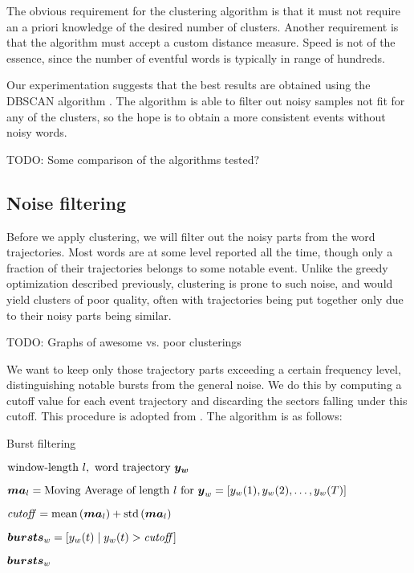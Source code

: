 The obvious requirement for the clustering algorithm is that it must not require an a priori knowledge of the desired number of clusters. Another requirement is that the algorithm must accept a custom distance measure. Speed is not of the essence, since the number of eventful words is typically in range of hundreds.

Our experimentation suggests that the best results are obtained using the DBSCAN algorithm \cite{dbscan}. The algorithm is able to filter out noisy samples not fit for any of the clusters, so the hope is to obtain a more consistent events without noisy words.

{\color{blue} TODO: Some comparison of the algorithms tested?}


\subsection{Noise filtering}
Before we apply clustering, we will filter out the noisy parts from the word trajectories. Most words are at some level reported all the time, though only a fraction of their trajectories belongs to some notable event. Unlike the greedy optimization described previously, clustering is prone to such noise, and would yield clusters of poor quality, often with trajectories being put together only due to their noisy parts being similar.

{\color{red} TODO: Graphs of awesome vs. poor clusterings}

We want to keep only those trajectory parts exceeding a certain frequency level, distinguishing notable bursts from the general noise. We do this by computing a cutoff value for each event trajectory and discarding the sectors falling under this cutoff. This procedure is adopted from \cite{online-search-queries}. The algorithm is as follows:

\begin{algorithm}[H]
\begin{algorithmic}[1]
\caption{Burst filtering}
\Input $\text{window-length} \ l,\ \text{word trajectory} \ \vect{\traj_{w}}$

\State $\vect{MA}_{l} = \text{Moving Average of length} ~ l ~ \text{for} ~ \vect{\traj}_{w} = \left[ \traj_{w}(1), \traj_{w}(2), \dots, \traj_{w}(\streamlen) \right]$

\State $\mathit{cutoff} = \text{mean} \left( \vect{MA}_{l} \right) + \text{std} \left( \vect{MA}_{l} \right)$

\State $\vect{bursts}_{w} = \left[ \traj_{w}(t) \mid \traj_{w	}(t) > \mathit{cutoff} \right]$

\Output $\vect{bursts}_{w}$
\end{algorithmic}
\end{algorithm}

